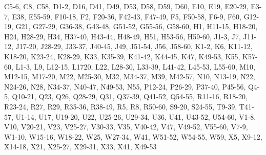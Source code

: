 \documentclass{article}
\begin{document}
C5-6, C8, C58, D1-2, D16, D41, D49, D53, D58, D59, D60, E10, E19, E20-29, E3-7, E38, E55-59, F10-18, F2, F20-36, F42-43, F47-49, F5, F50-58, F6-9, F60, G12-19, G21, G27-29, G36-38, G43-48, G51-52, G55-56, G58-60, H1, H11-15, H18-20, H24, H28-29, H34, H37-40, H43-44, H48-49, H51, H53-56, H59-60, J1-3,  J7, J11-12, J17-20, J28-29, J33-37, J40-45, J49, J51-54, J56, J58-60, K1-2,  K6, K11-12, K18-20, K23-24, K28-29, K33, K35-39, K41-42, K44-45, K47, K49-53, K55, K57-60, L1-3, L9, L12-15, L1720, L22, L28-30, L33-39, L41-42, L45-53, L55-60,  M10, M12-15, M17-20, M22, M25-30, M32, M34-37, M39, M42-57, N10, N13-19, N22, N24-26, N28, N34-37, N40-47, N49-53, N55, P12-24, P26-29, P37-40, P45-56, Q4-5, Q10-21, Q23, Q26, Q28-29, Q31, Q37-39, Q41-52, Q54-55, R11-16, R18-20, R23-24, R27, R29, R35-36, R38-49, R5, R8, R50-60, S9-20, S24-55,  T9-39, T41-57, U1-14, U17, U19-20, U22, U25-26, U29-34, U36, U41, U43-52, U54-60, V1-8, V10, V20-21, V23, V25-27, V30-33, V35, V40-42, V47, V49-52, V55-60, V7-9, W1-10, W15-16, W18-22, W25, W27-34, W41, W51-52, W54-55, W59, X5, X9-12, X14-18, X21, X25-27, X29-31, X33, X41, X49-53
\end{document}
